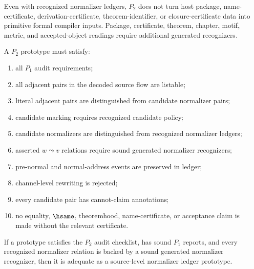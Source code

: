 \begin{corollary}
\label{cor:source-normalizer-p2-below-package}
Even with recognized normalizer ledgers, $P_2$ does not turn host package, name-certificate, derivation-certificate, theorem-identifier, or closure-certificate data into primitive formal compiler inputs. Package, certificate, theorem, chapter, motif, metric, and accepted-object readings require additional generated recognizers.
\end{corollary}

\begin{definition}
\label{def:source-normalizer-p2-audit}
A $P_2$ prototype must satisfy:
\begin{enumerate}
\item all $P_1$ audit requirements;
\item all adjacent pairs in the decoded source flow are listable;
\item literal adjacent pairs are distinguished from candidate normalizer pairs;
\item candidate marking requires recognized candidate policy;
\item candidate normalizers are distinguished from recognized normalizer ledgers;
\item asserted $w\leadsto v$ relations require sound generated normalizer recognizers;
\item pre-normal and normal-address events are preserved in ledger;
\item channel-level rewriting is rejected;
\item every candidate pair has cannot-claim annotations;
\item no equality, $\hsame$, theoremhood, name-certificate, or acceptance claim is made without the relevant certificate.
\end{enumerate}
\end{definition}

\begin{theorem}
\label{thm:source-normalizer-p2-adequacy}
If a prototype satisfies the $P_2$ audit checklist, has sound $P_1$ reports, and every recognized normalizer relation is backed by a sound generated normalizer recognizer, then it is adequate as a source-level normalizer ledger prototype.
\end{theorem}

